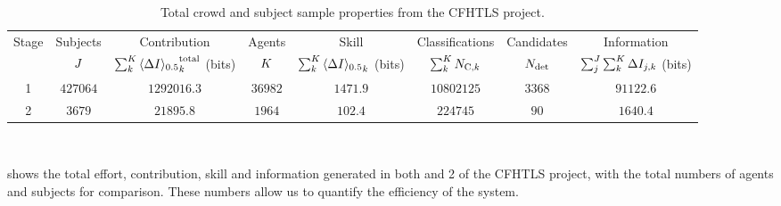\documentclass[useAMS,usenatbib,a4paper]{mn2e}
\begin{document}
\begin{table}
\begin{center}
\caption{Total crowd and subject sample properties from the CFHTLS project.}
\label{tab:crowd:contributions}
\begin{tabular}{cccccccc}
  \hline
  \hline {Stage} & Subjects & Contribution                          & Agents & Skill      & Classifications          & Candidates & Information \\
                           & $J$    & $\sum_k^{K} {\langle \Delta I \rangle_{0.5}}^{\rm total}_k$ (bits) & $K$  & $\sum_k^{K} {\langle \Delta I \rangle_{0.5}}_k$ (bits) & $\sum_k^{K} N_{{\rm C},k}$ & $N_{\rm det}$  & $\sum_j^{J}\sum_k^{K} \Delta I_{j,k}$ (bits) \\
            \hline
                      1    & $427064$ & $1292016.3$ & $36982$ & $1471.9$ & $10802125$ & $3368$ & $91122.6$ \\
                      2    & $3679$   &   $21895.8$ &  $1964$ &  $102.4$ &   $224745$ &   $90$ &  $1640.4$ \\
  \hline \hline
\end{tabular}
\medskip\\
\end{center}
\end{table}



 shows the total effort, contribution, skill and
information generated in both \StageOne and 2 of the CFHTLS project, with the
total numbers of agents and subjects for comparison.   These numbers allow us
to quantify the efficiency of the system.
\end{document}
